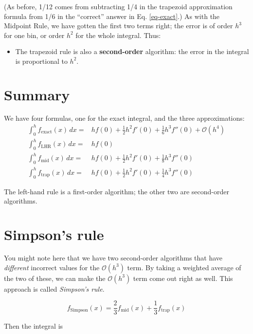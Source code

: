 \documentclass[12ampt]{article}
\begin{document}
(As before, 1/12 comes from subtracting 1/4 in the trapezoid approximation formula from 1/6 in the ``correct'' answer in Eq. \ref{eq-exact}.)
As with the Midpoint Rule, we have gotten the first two terms right; the error is of order $h^3$ for one bin, or order $h^2$ for the whole integral. Thus:

\begin{itemize}
      \item{The trapezoid rule is also a {\bf second-order} algorithm: the error in the integral is proportional to $h^2$.}
 \end{itemize}



 \section{Summary}

 We have four formulas, one for the exact integral, and the three approximations:
 \begin{align}
   \int_0^h f_{\mathrm{exact}}(x)\, dx=& hf(0) + \frac{1}{2}h^2f'(0) + \frac{1}{6} h^3 f''(0) + \mathcal O(h^4) \\
 \int_0^h f_{\mathrm{LHR}}(x)\, dx =& hf(0) \\
 \int_0^h f_{\mathrm{mid}}(x)\, dx =& hf(0) + \frac{1}{2}h^2 f'(0) + \frac{1}{8} h^3 f''(0)\\ 
 \int_0^h f_{\mathrm{trap}}(x)\, dx =& hf(0) + \frac{1}{2}h^2 f'(0) + \frac{1}{4} h^3 f''(0)
 \end{align}

 The left-hand rule is a first-order algorithm; the other two are second-order algorithms.

 \section{Simpson's rule}

 You might note here that we have two second-order algorithms that have {\it different} incorrect values for the $\mathcal O(h^3)$ term. By taking a weighted average of the two of these, we can
 make the $\mathcal O(h^3)$ term come out right as well. This approach is called {\it Simpson's rule}.

 \begin{equation}
   f_{\mathrm{Simpson}}(x) = \frac{2}{3} f_{\mathrm{mid}}(x) + \frac{1}{3} f_{\mathrm{trap}}(x) 
 \end{equation}

 Then the integral is 
\end{document}
